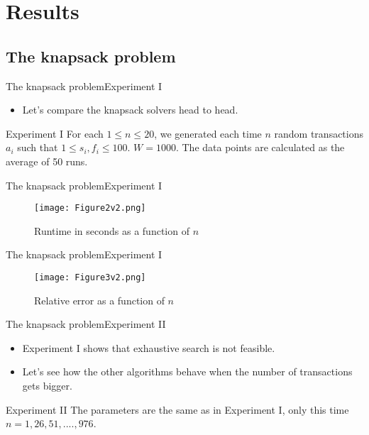\documentclass{beamer}
\begin{document}
\section{Results}
\subsection*{The knapsack problem}
\begin{frame}{The knapsack problem}{Experiment I} %
    \begin{itemize}
        \item {Let's compare the knapsack solvers head to head.}
    \end{itemize}
    \begin{block}{Experiment I}
     For each $1\leq n \leq 20$, we generated each time $n$ random 
     transactions $a_i$ such that $1\leq s_i,f_i\leq 100$. $W=1000$. The 
     data points are calculated as the average of 50 runs.
    \end{block}
\end{frame}

\begin{frame}{The knapsack problem}{Experiment I} %
    \begin{figure}
        \centering
        \texttt{[image: Figure2v2.png]}
        \caption{Runtime in seconds as a function of $n$}
    \end{figure}
\end{frame}

\begin{frame}{The knapsack problem}{Experiment I} %
    \begin{figure}
        \centering
        \texttt{[image: Figure3v2.png]}
        \caption{Relative error as a function of $n$}
    \end{figure}
\end{frame}
\begin{frame}{The knapsack problem}{Experiment II} %
    \begin{itemize}
        \item {Experiment I shows that exhaustive search is not feasible.}
        \item {Let's see how the other algorithms behave when the number of 
        transactions gets bigger.}
    \end{itemize}
    \begin{block}{Experiment II}
    The parameters are the same as in Experiment I, only this time 
    $n = 1,26,51,....,976$.
    \end{block}
\end{frame}
\end{document}
